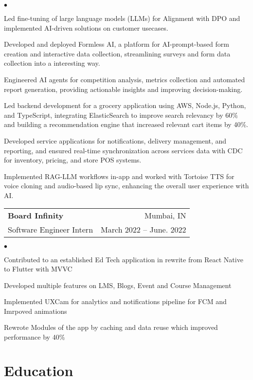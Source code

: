 \documentclass[margin, 11pt]{res}
\makeatletter
\newcommand{\resumeSubheading}[4]{

\begin{tabular*}{1.01\textwidth}{@{\hspace{-4pt}}l @{\extracolsep{\fill}} r}
\textbf{#1} & #2 \\
      {#3} &  {#4}
\end{tabular*}\vspace{-2pt}
}
\newenvironment{list2}{
	\begin{list}{$\bullet$}{%
	    \small
		\setlength{\itemsep}{0in}
		\setlength{\parsep}{0in} \setlength{\parskip}{0in}
		\setlength{\topsep}{0in} \setlength{\partopsep}{0in}
		\setlength{\leftmargin}{0.2in}}}{\end{list}}
\makeatother
\begin{document}
\begin{resume}
\begin{list2}
\item {Led fine-tuning of large language models (LLMs) for Alignment with DPO and implemented AI-driven solutions on customer usecases.}
\item {Developed and deployed Formless AI, a platform for AI-prompt-based form creation and interactive data collection, streamlining surveys and form data collection into a interesting way.}
\item {Engineered AI agents for competition analysis, metrics collection and automated report generation, providing actionable insights and improving decision-making.}
\item {Led backend development for a grocery application using AWS, Node.js, Python, and TypeScript, integrating ElasticSearch to improve search relevancy by 60\% and building a recommendation engine that increased relevant cart items by 40\%.}
\item {Developed service applications for notifications, delivery management, and reporting, and ensured real-time synchronization across services data with CDC for inventory, pricing, and store POS systems.}
\item {Implemented RAG-LLM workflows in-app and worked with Tortoise TTS for voice cloning and audio-based lip sync, enhancing the overall user experience with AI.}
\end{list2}



\resumeSubheading{{\bf Board Infinity}}{Mumbai, IN}
                 {Software Engineer Intern}{March 2022 -- June. 2022}
                 
\begin{list2}
\item{Contributed to an established Ed Tech application in rewrite from React Native to Flutter with MVVC}
\item{Developed multiple features on LMS, Blogs, Event and Course Management}
\item{Implemented UXCam for analytics and notifications pipeline for FCM and Imrpoved animations}
\item{Rewrote Modules of the app by caching and data reuse which improved performance by 40\%}
\end{list2}

\section{\sc Education}


\end{resume}
\end{document}
